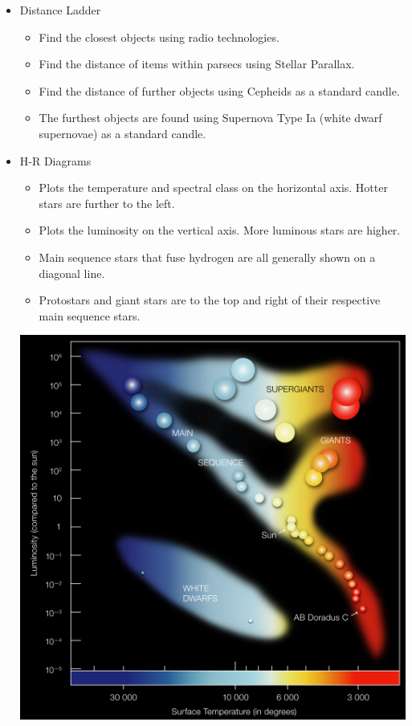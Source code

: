\documentclass[letterpaper,14pt]{extarticle}
\begin{document}
\begin{itemize}
    \item Distance Ladder
    \begin{itemize}
        \item Find the closest objects using radio technologies.
        \item Find the distance of items within parsecs using Stellar Parallax.
        \item Find the distance of further objects using Cepheids as a standard candle.
        \item The furthest objects are found using Supernova Type Ia (white dwarf supernovae) as a standard candle.
    \end{itemize}
    \pagebreak
    \item H-R Diagrams
    \begin{itemize}
        \item Plots the temperature and spectral class on the horizontal axis. Hotter stars are further to the left.
        \item Plots the luminosity on the vertical axis. More luminous stars are higher.
        \item Main sequence stars that fuse hydrogen are all generally shown on a diagonal line.
        \item Protostars and giant stars are to the top and right of their respective main sequence stars.
    \end{itemize}
    \begin{center}
        \includegraphics[scale=0.7]{hr.png}
    \end{center}
\end{itemize}
\end{document}
